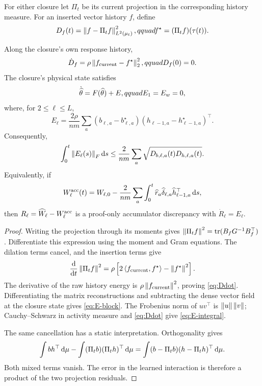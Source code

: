 For either closure let $\Pi_t$ be its current projection in the corresponding
history measure.  For an inserted vector history $f$, define
\begin{equation}
 D_f(t)=\left\lVert f-\Pi_tf\right\rVert_{L^2(\mu_t)}^2,qquad
 f^\star=(\Pi_tf)(\tau(t)).
 \label{eq:Df}
\end{equation}

\begin{lemma}
\label{lem:defect}
Along the closure's own response history,
\begin{equation}
 \dot D_f=\rho\left\lVert f_{\rm current}-f^\star\right\rVert_2^2,qquad D_f(0)=0.
 \label{eq:Ddot}
\end{equation}
The closure's physical state satisfies
\begin{equation}
 \dot{\widehat\theta}=F(\widehat\theta)+E,qquad E_1=E_w=0,
 \label{eq:perturbed-flow}
\end{equation}
where, for $2\le\ell\le L$,
\begin{equation}
 E_\ell=\frac{2\rho}{nm}\sum_a
 (b_{\ell,a}-b_{\ell,a}^\star)
 (h_{\ell-1,a}-h_{\ell-1,a}^\star)^\top .
 \label{eq:E-block}
\end{equation}
Consequently,
\begin{equation}
 \int_0^t\left\lVert E_\ell(s)\right\rVert_F\mathop{}\!\mathrm d s
 \le\frac{2}{nm}\sum_a
 \sqrt{D_{b,\ell,a}(t)D_{h,\ell,a}(t)}.
 \label{eq:E-integral}
\end{equation}
Equivalently, if
\begin{equation}
 W_\ell^{\rm acc}(t)=W_{\ell,0}
 -\frac2{nm}\sum_a\int_0^t
 \widehat r_a\widehat\delta_{\ell,a}\widehat h_{\ell-1,a}^\top\mathop{}\!\mathrm d s,
\end{equation}
then $R_\ell=\widehat W_\ell-W_\ell^{\rm acc}$ is a proof-only accumulator
discrepancy with $\dot R_\ell=E_\ell$.
\end{lemma}

\begin{proof}
Writing the projection through its moments gives
$\left\lVert \Pi_tf\right\rVert^2=\operatorname{tr}(B_fG^{-1}B_f^\top)$.  Differentiate this
expression using the moment and Gram equations.  The dilation terms cancel,
and the insertion terms give
\begin{equation}
 \frac{\mathop{}\!\mathrm d}{\mathop{}\!\mathrm d t}\left\lVert \Pi_tf\right\rVert^2
 =\rho\left[2\left\langle f_{\rm current},f^\star\right\rangle-\left\lVert f^\star\right\rVert^2\right].
\end{equation}
The derivative of the raw history energy is
$\rho\left\lVert f_{\rm current}\right\rVert^2$, proving \eqref{eq:Ddot}.  Differentiating the
matrix reconstructions and subtracting the dense vector field at the closure
state gives \eqref{eq:E-block}.  The Frobenius norm of $uv^\top$ is
$\left\lVert u\right\rVert\left\lVert v\right\rVert$; Cauchy--Schwarz in activity measure and
\eqref{eq:Ddot} give \eqref{eq:E-integral}.

The same cancellation has a static interpretation.  Orthogonality gives
\begin{equation}
 \int bh^\top\mathop{}\!\mathrm d\mu-
 \int(\Pi_tb)(\Pi_th)^\top\mathop{}\!\mathrm d\mu
 =\int(b-\Pi_tb)(h-\Pi_th)^\top\mathop{}\!\mathrm d\mu.
 \label{eq:product-orthogonality}
\end{equation}
Both mixed terms vanish.  The error in the learned interaction is therefore a
product of the two projection residuals.
\end{proof}


